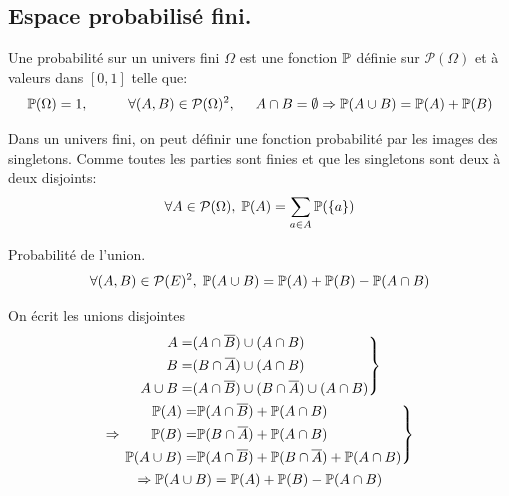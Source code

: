 \subsection{Espace probabilisé fini.}
\begin{defi}
 Une probabilité sur un univers fini $\Omega$ est une fonction $\mathbb{P}$ définie sur $\mathcal{P}(\Omega)$ et à valeurs dans $[0,1]$ telle que:
\begin{displaymath}
 \mathbb{P}(\Omega) = 1, \hspace{1cm} \forall (A,B)\in \mathcal{P}(\Omega)^2, \hspace{0.5cm} A\cap B = \emptyset \Rightarrow \mathbb{P}(A\cup B) = \mathbb{P}(A) + \mathbb{P}(B)
\end{displaymath}
\end{defi}
Dans un univers fini, on peut définir une fonction probabilité par les images des singletons. Comme toutes les parties sont finies et que les singletons sont deux à deux disjoints:
\begin{displaymath}
\forall A\in \mathcal{P}(\Omega), \; \mathbb{P}(A) = \sum_{a\in A} \mathbb{P}(\left\lbrace a \right\rbrace )
\end{displaymath}

\begin{prop}Probabilité de l'union.
 \begin{displaymath}
\forall (A,B) \in \mathcal{P}(E)^2, \; \mathbb{P}(A\cup B) = \mathbb{P}(A) + \mathbb{P}(B) - \mathbb{P}(A\cap B)  
 \end{displaymath}
\end{prop}
\begin{demo}
 On écrit les unions disjointes
\begin{multline*}
\left. 
\begin{aligned}
 A =& (A\cap \overline{B}) \cup (A\cap B) \\ B =& (B\cap \overline{A}) \cup (A\cap B)\\ A \cup B =& (A\cap \overline{B}) \cup (B\cap \overline{A}) \cup (A\cap B) 
\end{aligned}
\right\rbrace \\
\Rightarrow
\left. 
\begin{aligned}
 \mathbb{P}(A) =& \mathbb{P}(A\cap \overline{B}) + \mathbb{P}(A\cap B) \\ \mathbb{P}(B) =& \mathbb{P}(B\cap \overline{A}) + \mathbb{P}(A\cap B)\\ 
 \mathbb{P}(A \cup B) =& \mathbb{P}(A\cap \overline{B}) + \mathbb{P}(B\cap \overline{A}) + \mathbb{P}(A\cap B)
\end{aligned}
\right\rbrace \\
\Rightarrow \mathbb{P}(A \cup B) = \mathbb{P}(A) + \mathbb{P}(B) - \mathbb{P}(A\cap B)
\end{multline*}
\end{demo}

